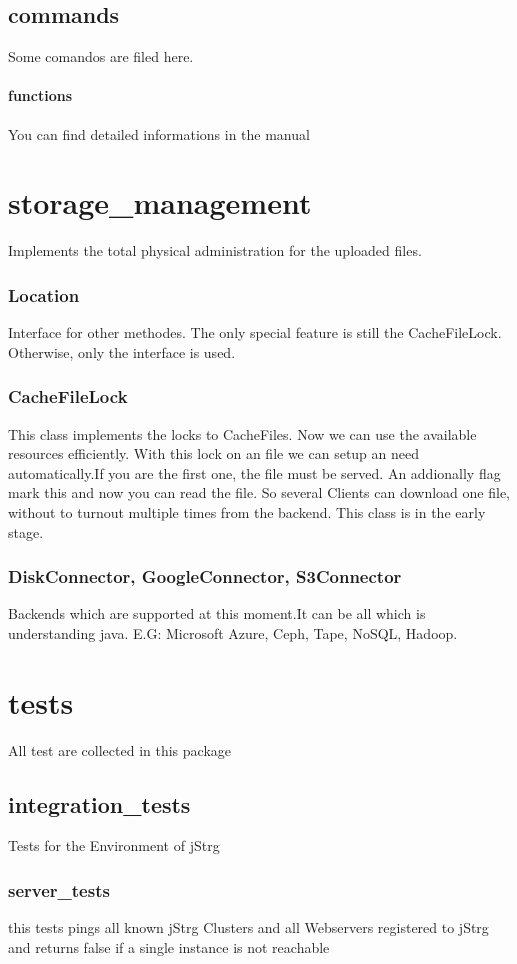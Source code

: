 \documentclass
[   oneside,         %
    12pt,            %
    DIV15,           %
    headsepline,     %
    footsepline,     %
    openright,       %
    a4paper,         %
    abstracton,      %
    titlepage,       %
    headinclude,     %
]   {scrreprt}       %
\begin{document}
	\subsection{commands}
	Some comandos are filed here.
	\paragraph{functions}
	You can find detailed informations in the manual
	\newpage
	\section{storage\_management}
	Implements the total physical administration for the uploaded files.
	\subsubsection{Location}
	Interface for other methodes. The only special feature is still the CacheFileLock. Otherwise, only the interface is used.
	\subsubsection{CacheFileLock}
	This class implements the locks to CacheFiles. Now we can use the available resources efficiently. With this lock on an file we can setup an need automatically.If you are the first one, the file must be served. An addionally flag mark this and now you can read the file. So several Clients can download one file, without to turnout multiple times from the backend. This class is in the early stage.
	\subsubsection{DiskConnector, GoogleConnector, S3Connector}
	Backends which are supported at this moment.It can be all which is understanding java. E.G:  Microsoft Azure, Ceph, Tape, NoSQL, Hadoop.
	
	\section{tests}
	All test are collected in this package
	\subsection{integration\_tests}
	Tests for the Environment of jStrg
	\subsubsection{server\_tests}
	this tests pings all known jStrg Clusters and all Webservers registered to jStrg and returns false if a single instance is not reachable
\end{document}
